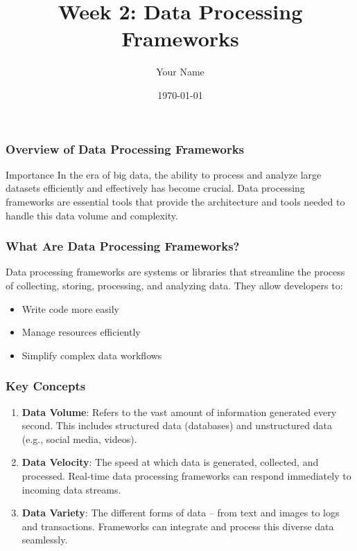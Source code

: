 \documentclass{beamer}
\title{Week 2: Data Processing Frameworks}
\author{Your Name}
\institute{Your Institution}
\date{\today}
\begin{document}
\frame{\titlepage}

\begin{frame}[fragile]
    \titlepage
\end{frame}

\begin{frame}[fragile]
    \frametitle{Overview of Data Processing Frameworks}
    \begin{block}{Importance}
        In the era of big data, the ability to process and analyze large datasets efficiently and effectively has become crucial. Data processing frameworks are essential tools that provide the architecture and tools needed to handle this data volume and complexity.
    \end{block}
\end{frame}

\begin{frame}[fragile]
    \frametitle{What Are Data Processing Frameworks?}
    Data processing frameworks are systems or libraries that streamline the process of collecting, storing, processing, and analyzing data. They allow developers to:
    \begin{itemize}
        \item Write code more easily
        \item Manage resources efficiently
        \item Simplify complex data workflows
    \end{itemize}
\end{frame}

\begin{frame}[fragile]
    \frametitle{Key Concepts}
    \begin{enumerate}
        \item \textbf{Data Volume}: Refers to the vast amount of information generated every second. This includes structured data (databases) and unstructured data (e.g., social media, videos).
        \item \textbf{Data Velocity}: The speed at which data is generated, collected, and processed. Real-time data processing frameworks can respond immediately to incoming data streams.
        \item \textbf{Data Variety}: The different forms of data – from text and images to logs and transactions. Frameworks can integrate and process this diverse data seamlessly.
    \end{enumerate}
\end{frame}
\end{document}
